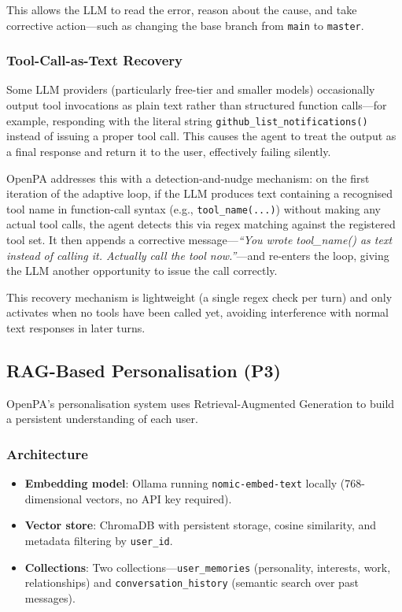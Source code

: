 This allows the LLM to read the error, reason about the cause, and take corrective action---such as changing the base branch from \texttt{main} to \texttt{master}.

\subsubsection{Tool-Call-as-Text Recovery}

Some LLM providers (particularly free-tier and smaller models) occasionally output tool invocations as plain text rather than structured function calls---for example, responding with the literal string \texttt{github\_list\_notifications()} instead of issuing a proper tool call. This causes the agent to treat the output as a final response and return it to the user, effectively failing silently.

OpenPA addresses this with a detection-and-nudge mechanism: on the first iteration of the adaptive loop, if the LLM produces text containing a recognised tool name in function-call syntax (e.g., \texttt{tool\_name(...)}) without making any actual tool calls, the agent detects this via regex matching against the registered tool set. It then appends a corrective message---\textit{``You wrote tool\_name() as text instead of calling it. Actually call the tool now.''}---and re-enters the loop, giving the LLM another opportunity to issue the call correctly.

This recovery mechanism is lightweight (a single regex check per turn) and only activates when no tools have been called yet, avoiding interference with normal text responses in later turns.

\subsection{RAG-Based Personalisation (P3)}

OpenPA's personalisation system uses Retrieval-Augmented Generation to build a persistent understanding of each user.

\subsubsection{Architecture}

\begin{itemize}[leftmargin=*]
  \item \textbf{Embedding model}: Ollama \cite{ollama2024} running \texttt{nomic-embed-text} locally (768-dimensional vectors, no API key required).
  \item \textbf{Vector store}: ChromaDB \cite{chromadb2024} with persistent storage, cosine similarity, and metadata filtering by \texttt{user\_id}.
  \item \textbf{Collections}: Two collections---\texttt{user\_memories} (personality, interests, work, relationships) and \texttt{conversation\_history} (semantic search over past messages).
\end{itemize}

